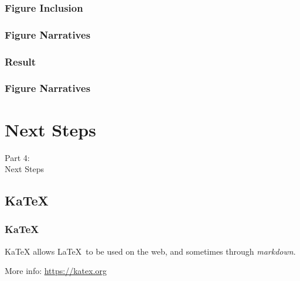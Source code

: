 {\begin{frame}[fragile]
\end{frame}

\subsubsection{Figure Inclusion}
\begin{frame}[fragile]
  \frametitle{Figure Narratives }
  \vspace{3mm}
  
\end{frame}

\subsubsection{Result}
\begin{frame}[fragile]
  \frametitle{Figure Narratives }
  \vspace{-14mm}
  \begin{center}
  \end{center}
\end{frame}

}


{
\renewcommand{\bgcolor}{next}

\section{Next Steps}
\begin{frame}
  \vspace{25mm}
  \begin{center}
    \Huge{Part 4:\\Next Steps}
  \end{center}
\end{frame}

\subsection{KaTeX}
\begin{frame}[fragile]
  \frametitle{KaTeX}
  \vspace{3mm}
  KaTeX allows \LaTeX\ to be used on the web, and sometimes through \textsl{markdown}.
  
  \vspace{5mm}
  More info: \url{https://katex.org}
\end{frame}

}

